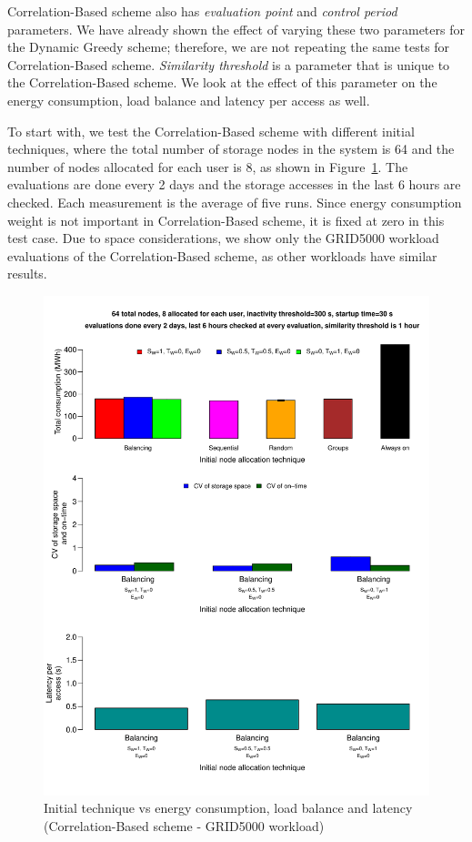 \documentclass[preprint,12pt]{elsarticle}
\begin{document}
Correlation-Based scheme also has \textit{evaluation point} and \textit{control period} parameters. We have
already shown the effect of varying these two parameters for the Dynamic Greedy scheme; therefore, we are not
repeating the same tests for Correlation-Based scheme. \textit{Similarity threshold} is a parameter that
is unique to the Correlation-Based scheme. We look at the effect of this parameter on the energy consumption,
load balance and latency per access as well.

To start with, we test the Correlation-Based scheme with different initial techniques, where the total number of
storage nodes in the system is 64 and the number of nodes allocated for each user is 8, as shown in 
Figure~\ref{seventhresult}. The evaluations are done every 2 days and the storage accesses in the last 6 hours
are checked. Each measurement is the average of five runs. Since energy consumption weight is not important
in Correlation-Based scheme, it is fixed at zero in this test case. Due to space considerations, we
show only the GRID5000 workload evaluations of the Correlation-Based scheme, as other workloads have similar
results.

\begin{figure}[!htbp]
\centering
\includegraphics[width=\columnwidth,keepaspectratio]{FIG12.pdf}
\caption{Initial technique vs energy consumption, load balance and latency (Correlation-Based scheme -
 GRID5000 workload)}
\label{seventhresult}
\end{figure}
\end{document}
